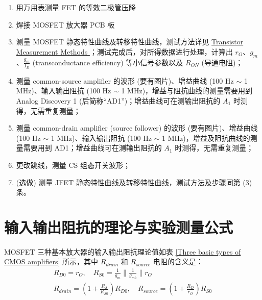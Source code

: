 \documentclass[UTF8]{article}
\begin{document}
\begin{enumerate}
\item 用万用表测量 FET 的等效二极管压降
\item 焊接 MOSFET 放大器 PCB 板
\item 测量 MOSFET 静态特性曲线及转移特性曲线，测试方法详见 %
    \href{https://yidingg.github.io/YiDingg/\#/Blogs/Electronics/Transistor\%20Measurement\%20Methods
    }{ %
    Transistor Measurement Methods
    }；测试完成后，对所得数据进行处理，计算出 $r_O$、$g_m$、$\frac{g_m}{I_D}$ (transconductance efficiency) 等小信号参数以及 $R_{ON}$ (导通电阻)；
\item 测量 common-source amplifier 的波形 (要有图片)、增益曲线 (100 Hz $\sim$ 1 MHz)、输入输出阻抗 (100 Hz $\sim$ 1 MHz)，增益与阻抗曲线的测量需要用到 Analog Discovery 1 (后简称``AD1'')；增益曲线可在测输出阻抗的 $A_1$ 时测得，无需重复测量；
\item 测量 common-drain amplifier (source follower) 的波形 (要有图片)、增益曲线 (100 Hz $\sim$ 1 MHz)、输入输出阻抗 (100 Hz $\sim$ 1 MHz)，增益及阻抗曲线的测量需要用到 AD1；增益曲线可在测输出阻抗的 $A_1$ 时测得，无需重复测量；
\item 更改跳线，测量 CS 组态开关波形；
\item (选做) 测量 JFET 静态特性曲线及转移特性曲线，测试方法及步骤同第 (3) 条。
\end{enumerate}

\section{输入输出阻抗的理论与实验测量公式}

MOSFET 三种基本放大器的输入输出阻抗理论值如表 \ref{Three basic types of CMOS amplifiers} 所示，其中 $R_{drain}$ 和 $R_{source} $ 电阻的含义是：
\begin{gather}
R_{D0} = r_O,\quad  R_{S0} = \frac{1}{g_m}\parallel \frac{1}{g_{mb}}\parallel r_O
\\
R_{drain} = \left(1 + \frac{R_S}{R_{S0}}\right)R_{D0},\quad 
R_{source} = \left(1 + \frac{R_D}{r_O}\right)R_{S0}
\end{gather}
\end{document}
